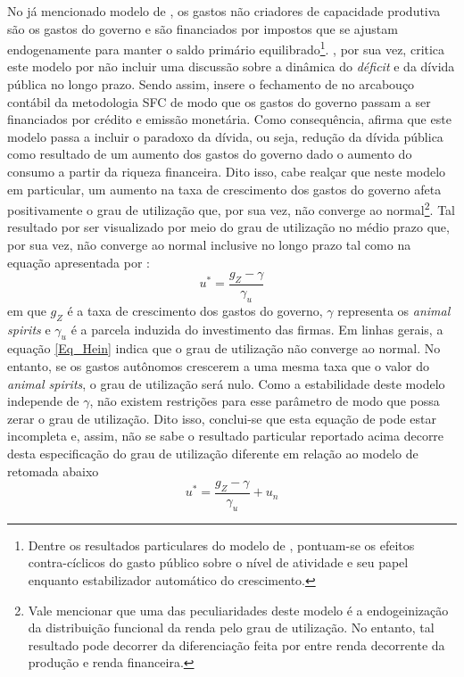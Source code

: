 No já mencionado modelo de \textcite{allain_tackling_2015}, os gastos não criadores de capacidade produtiva são os gastos do governo e são financiados por impostos que se ajustam endogenamente para manter o saldo primário equilibrado\footnote{
	Dentre os resultados particulares do modelo de \textcite{allain_tackling_2015}, pontuam-se os efeitos contra-cíclicos do gasto público sobre o nível de atividade e seu papel enquanto estabilizador automático do crescimento.
}.  
\textcite{hein_autonomous_2018}, por sua vez, critica este modelo por não incluir uma discussão sobre a dinâmica do \textit{déficit} e da dívida pública no longo prazo. 
Sendo assim, insere o fechamento de \textcite{allain_tackling_2015} no arcabouço contábil da metodologia SFC de modo que os gastos do governo passam a ser financiados por crédito e emissão monetária. Como consequência, \textcite{hein_autonomous_2018} afirma que este modelo passa a incluir o paradoxo da dívida, ou seja, redução da dívida pública como resultado de um aumento dos gastos do governo dado o aumento do consumo a partir da riqueza financeira. 
Dito isso, cabe realçar que neste modelo em particular, um aumento na taxa de crescimento dos gastos do governo afeta positivamente o grau de utilização que, por sua vez, não converge ao normal\footnote{
	Vale mencionar que uma das peculiaridades deste modelo é a endogeinização da distribuição funcional da renda pelo grau de utilização. No entanto, tal resultado pode decorrer da diferenciação feita por \textcite{hein_autonomous_2018} entre renda decorrente da produção e renda financeira.
}.
Tal resultado por ser visualizado por meio do grau de utilização no médio prazo que, por sua vez, não converge ao normal inclusive no longo prazo tal como na equação apresentada por \textcite[p.~326]{hein_autonomous_2018}:
\begin{equation}
\label{Eq_Hein}
u^* = \frac{g_Z - \gamma}{\gamma_u}
\end{equation}
em que $g_Z$ é a taxa de crescimento dos gastos do governo, $\gamma$ representa os \textit{animal spirits} e $\gamma_u$ é a parcela induzida do investimento das firmas.
Em linhas gerais, a equação \ref{Eq_Hein} indica que o grau de utilização não converge ao normal.
No entanto, se os gastos autônomos crescerem a uma mesma taxa que o valor do \textit{animal spirits}, o grau de utilização será nulo.
Como a estabilidade deste modelo independe de $\gamma$, não existem restrições para esse parâmetro de modo que possa zerar o grau de utilização. Dito isso, conclui-se que esta equação de \textcite[p.~326]{hein_autonomous_2018} pode estar incompleta e, assim, não se sabe o resultado particular reportado acima decorre desta especificação do grau de utilização diferente em relação ao modelo de \textcite{allain_tackling_2015} retomada abaixo
$$
u^* = \frac{g_Z - \gamma}{\gamma_u} + u_n
$$

